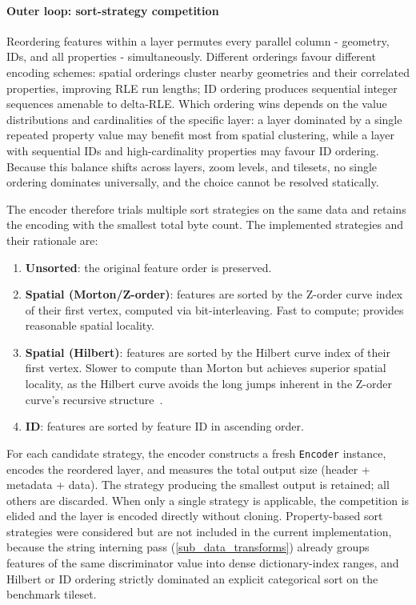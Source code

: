 \paragraph{Outer loop: sort-strategy competition}
Reordering features within a layer permutes every parallel column - geometry, IDs, and all properties - simultaneously.
Different orderings favour different encoding schemes: spatial orderings cluster nearby geometries and their correlated properties, improving \ac{RLE} run lengths; ID ordering produces sequential integer sequences amenable to delta-\acs{RLE}.
Which ordering wins depends on the value distributions and cardinalities of the specific layer: a layer dominated by a single repeated property value may benefit most from spatial clustering, while a layer with sequential IDs and high-cardinality properties may favour ID ordering.
Because this balance shifts across layers, zoom levels, and tilesets, no single ordering dominates universally, and the choice cannot be resolved statically.

The encoder therefore trials multiple sort strategies on the same data and retains the encoding with the smallest total byte count.
The implemented strategies and their rationale are:

\begin{enumerate}
    \item \textbf{Unsorted}: the original feature order is preserved.
    \item \textbf{Spatial (Morton/Z-order)}: features are sorted by the Z-order curve index of their first vertex, computed via bit-interleaving.  Fast to compute; provides reasonable spatial locality.
    \item \textbf{Spatial (Hilbert)}: features are sorted by the Hilbert curve index of their first vertex.  Slower to compute than Morton but achieves superior spatial locality, as the Hilbert curve avoids the long jumps inherent in the Z-order curve's recursive structure~\cite{moonAnalysisClusteringProperties2001}.
    \item \textbf{ID}: features are sorted by feature ID in ascending order.
\end{enumerate}

For each candidate strategy, the encoder constructs a fresh \texttt{Encoder} instance, encodes the reordered layer, and measures the total output size (header + metadata + data).
The strategy producing the smallest output is retained; all others are discarded.
When only a single strategy is applicable, the competition is elided and the layer is encoded directly without cloning.
Property-based sort strategies were considered but are not included in the current implementation, because the string interning pass (\cref{sub_data_transforms}) already groups features of the same discriminator value into dense dictionary-index ranges, and Hilbert or ID ordering strictly dominated an explicit categorical sort on the benchmark tileset.

